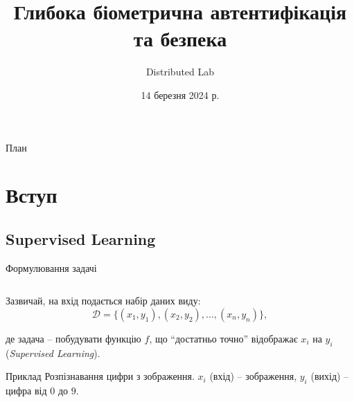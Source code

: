 \documentclass[xcolor={usenames,dvipsnames}]{beamer}
\title{\textbf{Глибока біометрична автентифікація та безпека}}
\author{Distributed Lab}
\date{14 березня 2024 р.}
\begin{document}
	\frame {
		\titlepage
	}
 
	\begin{frame}{План}
        \tableofcontents
    \end{frame}
	 
	\section{Вступ}
	\subsection{Supervised Learning}
	\begin{frame}{Формулювання задачі}	
		\begin{columns}
            \begin{column}{0.6\textwidth}
                Зазвичай, на вхід подається набір даних виду:
                \begin{equation*}
                    \mathcal{D} = \{(x_1,y_1),(x_2,y_2),\dots,(x_n,y_n)\},
                \end{equation*}
                
                де задача -- побудувати функцію $f$, що ``достатньо точно'' відображає $x_i$ на $y_i$ (\textit{Supervised Learning}).
    
                \begin{exampleblock}{Приклад}
                    Розпізнавання цифри з зображення. $x_i$ (вхід) -- зображення, $y_i$ (вихід) -- цифра від $0$ до $9$.
                \end{exampleblock}
            \end{column}


\end{columns}
\end{frame}
\end{document}
